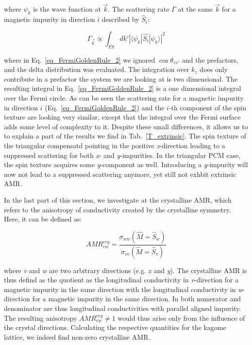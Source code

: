 \documentclass[prb,showpacs,amsmath,amssymb,superscriptaddress,twocolumn,floatfix]{revtex4-1}
\begin{document}
where $\psi_k$ is the wave function at $\vec{k}$. The scattering rate $\Gamma$ at the same $\vec{k}$ for a magnetic impurity in direction $i$ described by $\hat{S}_i$:

\begin{equation}	
	{\Gamma_{\vec{k}}} \propto \int_{FS} dk' |\langle \psi_k |\hat{S_i}|\psi_k \rangle|^2
	\label{eq_FermiGoldenRule_2}
\end{equation}

where in Eq.~\ref{eq_FermiGoldenRule_2} we ignored $\cos \theta_{vv'}$ and the prefactors, and the delta distribution was evaluated. The integration over $k_z$ does only contribute in a prefactor the system we are looking at is two dimensional. The resulting integral in Eq.~\ref{eq_FermiGoldenRule_2} is a one dimensional integral over the Fermi circle. As can be seen the scattering rate for a magnetic impurity in direction $i$ (Eq.~\ref{eq_FermiGoldenRule_2}) and the $i$-th component of the spin texture are looking very similar, except that the integral over the Fermi surface adds some level of complexity to it. Despite these small differences, it allows us to to explain a part of the results we find in Tab.~\ref{T_extrinsic}. The spin texture of the triangular compensatd pointing in the positive \textit{z}-direction leading to a suppressed scattering for both \textit{x}- and \textit{y}-impurities. In the triangular {\color{blue} PCM} case, the spin texture acquires some \textit{y}-component as well. Introducing a \textit{y}-impurity will now not lead to a suppressed scattering anymore, yet still not exhbit extrinsic AMR.

In the last part of this section, we investigate at the crystalline AMR, which refers to the anisotropy of conductivity created by the crystalline symmetry. Here, it can be defined as:

\begin{equation}
	AMR^{cry}_{vw} = \frac{\sigma_{ww} (\hat{M} = \hat{S}_w)}{\sigma_{vv} (\hat{M} = \hat{S}_v)}
\end{equation}

where \textit{v} and \textit{w} are two arbitrary directions (e.g. \textit{x} and \textit{y}). The crystalline AMR is thus defind as the quotient as the longitudinal conductivity in \textit{v}-direction for a magnetic impurity in the same direction with the longitudinal conductivity in \textit{w}-direction for a magnetic impurity in the same direction. In both numerator and denominator are thus longitudinal conductivities with parallel aligned impurity. The resulting anisotropy $AMR^{cry}_{vw} \neq 1$ would thus arise only from the influence of the crystal directions. Calculating the respective quantities for the kagome lattice, we indeed find non-zero crystalline AMR.
\end{document}
